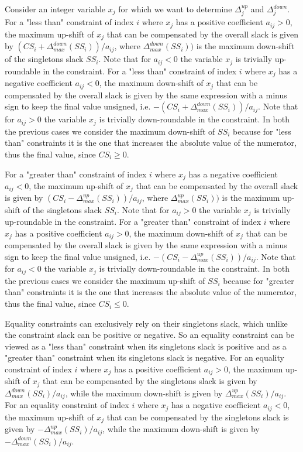 \documentclass[a4paper,12pt]{book}
\begin{document}
Consider an integer variable $x_j$ for which we want to determine $\Delta_{j}^{up}$ and $\Delta_{j}^{down}$.
For a "less than" constraint of index $i$ where $x_j$ has a positive coefficient $a_{ij} > 0$, the maximum up-shift of $x_j$ that can be compensated by the overall slack is given by $(CS_i + \Delta_{max}^{down}(SS_i)) / a_{ij}$, where $\Delta_{max}^{down}(SS_i))$ is the maximum down-shift of the singletons slack $SS_i$. Note that for $a_{ij} < 0$ the variable $x_j$ is trivially up-roundable in the constraint.
For a "less than" constraint of index $i$ where $x_j$ has a negative coefficient $a_{ij} < 0$, the maximum down-shift of $x_j$ that can be compensated by the overall slack is given by the same expression with a minus sign to keep the final value unsigned, i.e. $-(CS_i + \Delta_{max}^{down}(SS_i)) / a_{ij}$. Note that for $a_{ij} > 0$ the variable $x_j$ is trivially down-roundable in the constraint. In both the previous cases we consider the maximum down-shift of $SS_i$ because for "less than" constraints it is the one that increases the absolute value of the numerator, thus the final value, since $CS_i \geq 0$. \par 
For a "greater than" constraint of index $i$ where $x_j$ has a negative coefficient $a_{ij} < 0$, the maximum up-shift of $x_j$ that can be compensated by the overall slack is given by $(CS_i - \Delta_{max}^{up}(SS_i)) / a_{ij}$, where $\Delta_{max}^{up}(SS_i))$ is the maximum up-shift of the singletons slack $SS_i$. Note that for $a_{ij} > 0$ the variable $x_j$ is trivially up-roundable in the constraint.
For a "greater than" constraint  of index $i$ where $x_j$ has a positive coefficient $a_{ij} > 0$, the maximum down-shift of $x_j$ that can be compensated by the overall slack is given by the same expression with a minus sign to keep the final value unsigned, i.e. $-(CS_i - \Delta_{max}^{up}(SS_i)) / a_{ij}$. Note that for $a_{ij} < 0$ the variable $x_j$ is trivially down-roundable in the constraint. In both the previous cases we consider the maximum up-shift of $SS_i$ because for "greater than" constraints it is the one that increases the absolute value of the numerator, thus the final value, since $CS_i \leq 0$. \par
Equality constraints can exclusively rely on their singletons slack, which unlike the constraint slack can be positive or negative. So an equality constraint can be viewed as a "less than" constraint when its singletons slack is positive and as a "greater than" constraint when its singletons slack is negative. For an equality constraint of index $i$ where $x_j$ has a positive coefficient $a_{ij} > 0$, the maximum up-shift of $x_j$ that can be compensated by the singletons slack is given by $\Delta_{max}^{down}(SS_i) / a_{ij}$, while the maximum down-shift is given by $\Delta_{max}^{up}(SS_i) / a_{ij}$. For an equality constraint of index $i$ where $x_j$ has a negative coefficient $a_{ij} < 0$, the maximum up-shift of $x_j$ that can be compensated by the singletons slack is given by $-\Delta_{max}^{up}(SS_i) / a_{ij}$, while the maximum down-shift is given by $-\Delta_{max}^{down}(SS_i) / a_{ij}$. \par 
\end{document}
